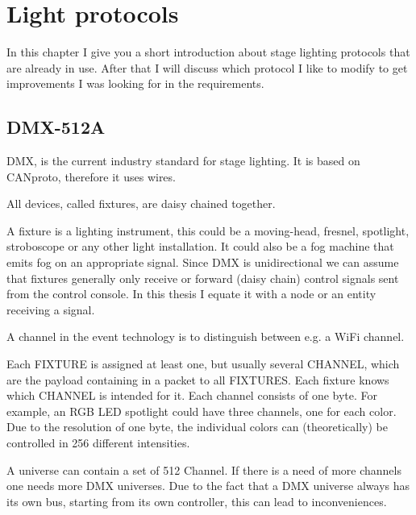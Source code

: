 \documentclass[]{ccs-thesis}
\begin{document}
\section{Light protocols}

In this chapter I give you a short introduction about stage lighting protocols that are already in use. 
After that I will discuss which protocol I like to modify to get improvements I was looking for in the requirements.

\subsection*{DMX-512A}
\ac{DMX}, is the current industry standard for stage lighting. It is based on \ac{CANproto}, therefore it uses wires.

All devices, called fixtures, are daisy chained together.

A fixture is a lighting instrument, 
this could be a moving-head, fresnel, spotlight, stroboscope or any other light installation.
It could also be a fog machine that emits fog on an appropriate signal.
Since \ac{DMX} is unidirectional we can assume that fixtures generally only receive or forward (daisy chain) control signals sent from the control console.
In this thesis I equate it with a node or an entity receiving a signal.

A channel in the event technology is to distinguish between e.g. a WiFi channel. 

Each FIXTURE is assigned at least one, but usually several CHANNEL, which are the payload containing in a packet to all FIXTURES. 
Each fixture knows which CHANNEL is intended for it. Each channel consists of one byte.
For example, an RGB LED spotlight could have three channels, one for each color.
Due to the resolution of one byte, the individual colors can (theoretically) be controlled in 256 different intensities.

A universe can contain a set of 512 Channel. If there is a need of more channels one needs more DMX universes.
Due to the fact that a DMX universe always has its own bus, starting from its own controller, this can lead to inconveniences.
\end{document}

